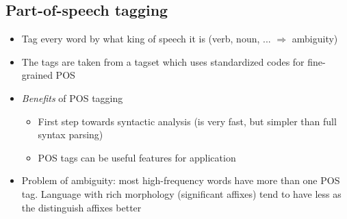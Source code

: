 \subsection{Part-of-speech tagging}
\begin{itemize}
	\item Tag every word by what king of speech it is (verb, noun, ... $\Rightarrow$ ambiguity)
	\item The tags are taken from a tagset which uses standardized codes for fine-grained POS
	\item \textit{Benefits} of POS tagging
	\begin{itemize}
		\item First step towards syntactic analysis (is very fast, but simpler than full syntax parsing)
		\item POS tags can be useful features for application
	\end{itemize}
	\item Problem of ambiguity: most high-frequency words have more than one POS tag. Language with rich morphology (significant affixes) tend to have less as the distinguish affixes better
\end{itemize}
